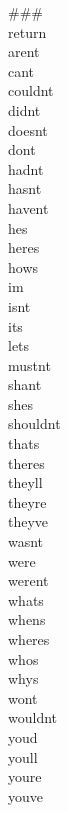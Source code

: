 \begin{appendices}
\begin{multicols}{7}
\#\#\#\\
return\\
arent\\
cant\\
couldnt\\
didnt\\
doesnt\\
dont\\
hadnt\\
hasnt\\
havent\\
hes\\
heres\\
hows\\
im\\
isnt\\
its\\
lets\\
mustnt\\
shant\\
shes\\
shouldnt\\
thats\\
theres\\
theyll\\
theyre\\
theyve\\
wasnt\\
were\\
werent\\
whats\\
whens\\
wheres\\
whos\\
whys\\
wont\\
wouldnt\\
youd\\
youll\\
youre\\
youve\\
\end{multicols}


\end{appendices}
